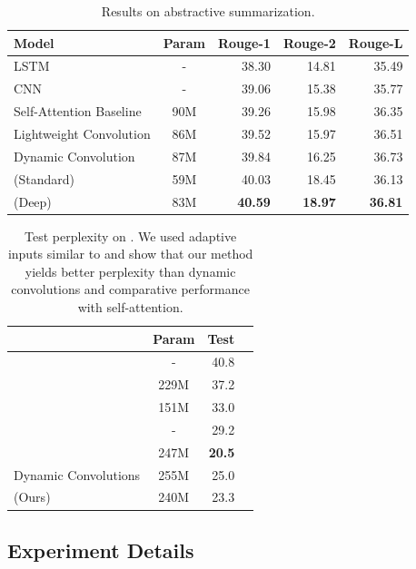 \documentclass{article}
\begin{document}
\begin{table}[t]
\caption{Results on \cnndm{} abstractive summarization.}
\label{tab:abs}
\vskip 0.15in
\centering
\begin{tabular}{lcrrr}
\toprule
Model & Param & Rouge-1 & Rouge-2 & Rouge-L \\    
\midrule
LSTM \cite{DBLP:journals/corr/PaulusXS17} & - & 38.30 & 14.81 &  35.49  \\ 
CNN \cite{DBLP:journals/corr/abs-1711-05217} & - & 39.06 & 15.38 & 35.77 \\
Self-Attention Baseline \cite{wu2019pay} & 90M & 39.26 & 15.98 & 36.35  \\
Lightweight Convolution \cite{wu2019pay} & 86M & 39.52 & 15.97 & 36.51  \\
Dynamic Convolution \cite{wu2019pay} & 87M & 39.84 & 16.25 & 36.73 \\
\midrule
\talkconvfull{} (Standard) & 59M & 40.03 & 18.45 & 36.13 \\
\talkconvfull{} (Deep) & 83M & \textbf{40.59} & \textbf{18.97} & \textbf{36.81} \\ 
\bottomrule
\end{tabular}
\end{table}

\begin{table}
\centering
\caption{Test perplexity on \wiki{}. We used adaptive inputs similar to \citet{DBLP:journals/corr/abs-1809-10853} and show that our method yields better perplexity than dynamic convolutions and comparative performance with self-attention.}
\vskip 0.15in
\begin{tabular}{lcrr}
\toprule
& Param & Test \\ \midrule
\citet{DBLP:journals/corr/GraveJU16} & - & 40.8 \\
\citet{DBLP:journals/corr/DauphinFAG16}  & 229M & 37.2 \\
\citet{DBLP:journals/corr/abs-1803-08240} & 151M & 33.0  \\
\citet{DBLP:journals/corr/abs-1803-10049} & - & 29.2 \\
\citet{DBLP:journals/corr/abs-1809-10853} & 247M & \textbf{20.5} \\
\midrule
Dynamic Convolutions & 255M & 25.0 \\
\talkconvfull{} (Ours) & 240M & 23.3 \\
\bottomrule
\end{tabular}
\label{tab:wiki_best}
\end{table}

\subsection{Experiment Details}
\end{document}
